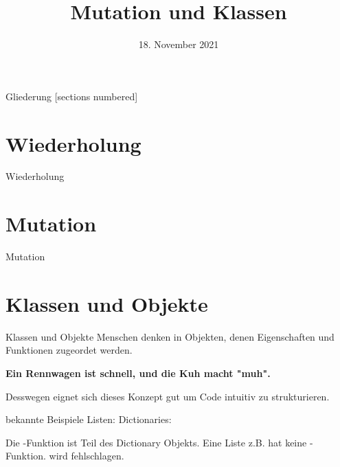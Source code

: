 



\title{Mutation und Klassen}
\date{18. November 2021}


	
\maketitle

\begin{frame}{Gliederung}
	[sections numbered]
	\tableofcontents
\end{frame}

\section{Wiederholung}
\begin{frame}{Wiederholung}
	
\end{frame}


\section{Mutation}
\begin{frame}{Mutation}
	
\end{frame}

\section{Klassen und Objekte}
\begin{frame}{Klassen und Objekte}
	Menschen denken in Objekten, denen Eigenschaften und Funktionen zugeordet werden. \linebreak
	\begin{center}
		 \textbf{Ein Rennwagen ist schnell, und die Kuh macht "muh".} \linebreak
	\end{center}
	Desswegen eignet sich dieses Konzept gut um Code intuitiv zu strukturieren.
\end{frame}
\begin{frame}{bekannte Beispiele}
	Listen: 
	\linebreak
	Dictionaries: 
	\linebreak
	
	Die -Funktion ist Teil des Dictionary Objekts. Eine Liste z.B. hat keine -Funktion. 
	\linebreak\linebreak
	 wird fehlschlagen.	
\end{frame}

